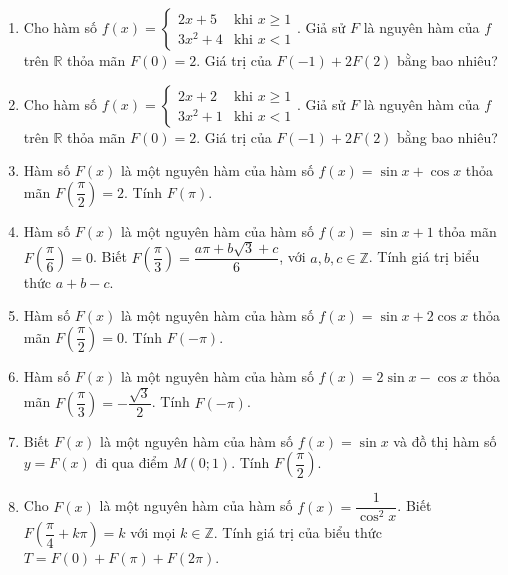 \documentclass[12pt]{article}
\begin{document}
\begin{enumerate}[label=\textbf{Câu \arabic*.}, start=1]
		
		\item Cho hàm số $f(x) = \begin{cases} 2x + 5 & \text{khi } x \ge 1 \\ 3x^2 + 4 & \text{khi } x < 1 \end{cases}$. Giả sử $F$ là nguyên hàm của $f$ trên $\mathbb{R}$ thỏa mãn $F(0) = 2$. Giá trị của $F(-1) + 2F(2)$ bằng bao nhiêu?
		 
		
		\item Cho hàm số $f(x) = \begin{cases} 2x + 2 & \text{khi } x \ge 1 \\ 3x^2 + 1 & \text{khi } x < 1 \end{cases}$. Giả sử $F$ là nguyên hàm của $f$ trên $\mathbb{R}$ thỏa mãn $F(0) = 2$. Giá trị của $F(-1) + 2F(2)$ bằng bao nhiêu?
		 
		
		\item Hàm số $F(x)$ là một nguyên hàm của hàm số $f(x) = \sin x + \cos x$ thỏa mãn $F\left(\dfrac{\pi}{2}\right) = 2$. Tính $F(\pi)$.
		 
		
		\item Hàm số $F(x)$ là một nguyên hàm của hàm số $f(x) = \sin x + 1$ thỏa mãn $F\left(\dfrac{\pi}{6}\right) = 0$. Biết $F\left(\dfrac{\pi}{3}\right) = \dfrac{a\pi + b\sqrt{3} + c}{6}$, với $a,b,c \in \mathbb{Z}$. Tính giá trị biểu thức $a + b - c$.
		 
		
		\item Hàm số $F(x)$ là một nguyên hàm của hàm số $f(x) = \sin x + 2\cos x$ thỏa mãn $F\left(\dfrac{\pi}{2}\right) = 0$. Tính $F(-\pi)$.
		 
		
		\item Hàm số $F(x)$ là một nguyên hàm của hàm số $f(x) = 2\sin x - \cos x$ thỏa mãn $F\left(\dfrac{\pi}{3}\right) = -\dfrac{\sqrt{3}}{2}$. Tính $F(-\pi)$.
		 
		\item Biết $F(x)$ là một nguyên hàm của hàm số $f(x) = \sin x$ và đồ thị hàm số $y = F(x)$ đi qua điểm $M(0; 1)$. Tính $F\left(\dfrac{\pi}{2}\right)$.
		
		
		\item Cho $F(x)$ là một nguyên hàm của hàm số $f(x) = \dfrac{1}{\cos^2 x}$. Biết $F\left(\dfrac{\pi}{4} + k\pi\right) = k$ với mọi $k \in \mathbb{Z}$. Tính giá trị của biểu thức $T = F(0) + F(\pi) + F(2\pi)$.
		

\end{enumerate}
\end{document}
